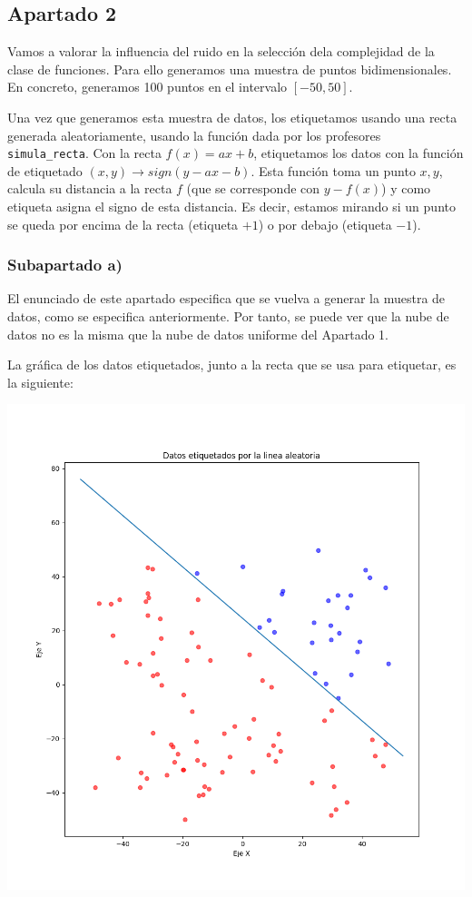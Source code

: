 \documentclass[11pt]{article}
\begin{document}
\subsection{Apartado 2}

Vamos a valorar la influencia del ruido en la selección dela complejidad de la clase de funciones. Para ello generamos una muestra de puntos bidimensionales. En concreto, generamos 100 puntos en el intervalo $[-50, 50]$.

Una vez que generamos esta muestra de datos, los etiquetamos usando una recta generada aleatoriamente, usando la función dada por los profesores \lstinline{simula_recta}. Con la recta $f(x) = ax + b$, etiquetamos los datos con la función de etiquetado $(x, y) \rightarrow sign(y - ax - b)$. Esta función toma un punto $x, y$, calcula su distancia a la recta $f$ (que se corresponde con $y - f(x)$) y como etiqueta asigna el signo de esta distancia. Es decir, estamos mirando si un punto se queda por encima de la recta (etiqueta $+1$) o por debajo (etiqueta $-1$).

\subsubsection{Subapartado a)}

El enunciado de este apartado especifica que se vuelva a generar la muestra de datos, como se especifica anteriormente. Por tanto, se puede ver que la nube de datos no es la misma que la nube de datos uniforme del Apartado 1.

La gráfica de los datos etiquetados, junto a la recta que se usa para etiquetar, es la siguiente:

\includegraphics[width=0.9 \textwidth]{puntos_clasificados_recta01}
\end{document}
